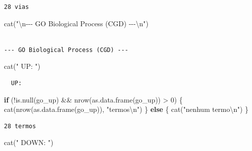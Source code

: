 \documentclass[
  letterpaper,
  DIV=11,
  numbers=noendperiod]{scrreprt}
\newenvironment{Shaded}{\begin{snugshade}}{\end{snugshade}}
\newcommand{\ControlFlowTok}[1]{\textcolor[rgb]{0.00,0.23,0.31}{\textbf{#1}}}
\newcommand{\DecValTok}[1]{\textcolor[rgb]{0.68,0.00,0.00}{#1}}
\newcommand{\FunctionTok}[1]{\textcolor[rgb]{0.28,0.35,0.67}{#1}}
\newcommand{\NormalTok}[1]{\textcolor[rgb]{0.00,0.23,0.31}{#1}}
\newcommand{\SpecialCharTok}[1]{\textcolor[rgb]{0.37,0.37,0.37}{#1}}
\newcommand{\StringTok}[1]{\textcolor[rgb]{0.13,0.47,0.30}{#1}}
\begin{document}
\begin{verbatim}
28 vias
\end{verbatim}

\begin{Shaded}
\begin{Highlighting}[]
\FunctionTok{cat}\NormalTok{(}\StringTok{"}\SpecialCharTok{\textbackslash{}n}\StringTok{{-}{-}{-} GO Biological Process (CGD) {-}{-}{-}}\SpecialCharTok{\textbackslash{}n}\StringTok{"}\NormalTok{)}
\end{Highlighting}
\end{Shaded}

\begin{verbatim}

--- GO Biological Process (CGD) ---
\end{verbatim}

\begin{Shaded}
\begin{Highlighting}[]
\FunctionTok{cat}\NormalTok{(}\StringTok{"  UP:   "}\NormalTok{)}
\end{Highlighting}
\end{Shaded}

\begin{verbatim}
  UP:   
\end{verbatim}

\begin{Shaded}
\begin{Highlighting}[]
\ControlFlowTok{if}\NormalTok{ (}\SpecialCharTok{!}\FunctionTok{is.null}\NormalTok{(go\_up) }\SpecialCharTok{\&\&} \FunctionTok{nrow}\NormalTok{(}\FunctionTok{as.data.frame}\NormalTok{(go\_up)) }\SpecialCharTok{\textgreater{}} \DecValTok{0}\NormalTok{) \{}
  \FunctionTok{cat}\NormalTok{(}\FunctionTok{nrow}\NormalTok{(}\FunctionTok{as.data.frame}\NormalTok{(go\_up)), }\StringTok{"termos}\SpecialCharTok{\textbackslash{}n}\StringTok{"}\NormalTok{)}
\NormalTok{\} }\ControlFlowTok{else}\NormalTok{ \{ }\FunctionTok{cat}\NormalTok{(}\StringTok{"nenhum termo}\SpecialCharTok{\textbackslash{}n}\StringTok{"}\NormalTok{) \}}
\end{Highlighting}
\end{Shaded}

\begin{verbatim}
28 termos
\end{verbatim}

\begin{Shaded}
\begin{Highlighting}[]
\FunctionTok{cat}\NormalTok{(}\StringTok{"  DOWN: "}\NormalTok{)}
\end{Highlighting}
\end{Shaded}
\end{document}
